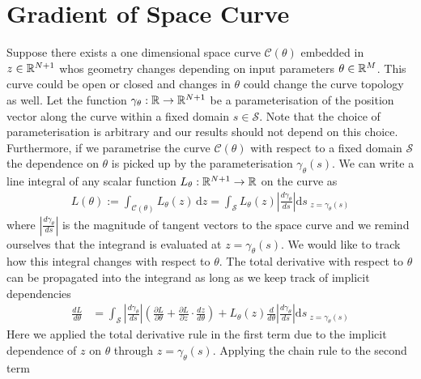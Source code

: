 \section{Gradient of Space Curve}
\label{appendix:space-curve}
Suppose there exists a one dimensional space curve $\mathcal{C(\theta)}$ embedded in $z\in\mathbb{R}^{N+1}$ whos geometry changes depending on input parameters $\theta\in\mathbb{R}^M$. This curve could be open or closed and changes in $\theta$ could change the curve topology as well. Let the function $\gamma_{\theta}:\mathbb{R}\rightarrow\mathbb{R}^{N+1}$ be a parameterisation of the position vector along the curve within a fixed domain $s\in\mathcal{S}$. Note that the choice of parameterisation is arbitrary and our results should not depend on this choice. Furthermore, if we parametrise the curve $\mathcal{C}(\theta)$ with respect to a fixed domain $\mathcal{S}$ the dependence on $\theta$ is picked up by the parameterisation $\gamma_{\theta}(s)$. We can write a line integral of any scalar function $L_{\theta}:\mathbb{R}^{N+1}\rightarrow\mathbb{R}$ on the curve as
\begin{align}
    L(\theta):=
    \int_\mathcal{C(\theta)}\! L_{\theta}(z)\,\mathrm{d}z
    =\int_\mathcal{S}\! L_{\theta}(z)\left|\frac{d\gamma_{\theta}}{ds}\right|\mathrm{d}s_{\,\,z=\gamma_{\theta}(s)}
\end{align}
where $\left|\frac{d\gamma_{\theta}}{ds}\right|$ is the magnitude of tangent vectors to the space curve and we remind ourselves that the integrand is evaluated at $z=\gamma_{\theta}(s)$. We would like to track how this integral changes with respect to $\theta$. The total derivative with respect to $\theta$ can be propagated into the integrand \cite{Flanders1973DifferentiationSign} as long as we keep track of implicit dependencies
\begin{align}
    \frac{dL}{d\theta} &=\int_\mathcal{S}
    \left|\frac{d\gamma_{\theta}}{ds}\right|
    \left(
        \frac{\partial L}{\partial\theta}+
        \frac{\partial L}{\partial z}\cdot
        \frac{dz}{d\theta}
    \right)
    +L_{\theta}(z)\frac{d}{d\theta}\left|\frac{d\gamma_{\theta}}{ds}\right|
    \mathrm{d}s_{\,\,z=\gamma_{\theta}(s)}
\end{align}
Here we applied the total derivative rule in the first term due to the implicit dependence of $z$ on $\theta$ through $z=\gamma_{\theta}(s)$. Applying the chain rule to the second term
